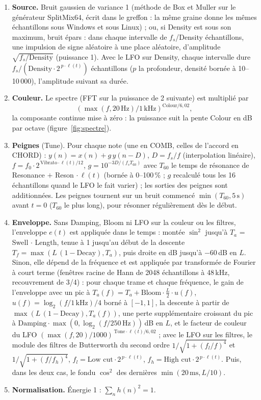 \documentclass[a4paper,11pt]{article}
\newcommand{\dB}{\,dB}
\begin{document}
\begin{enumerate}
\item \textbf{Source.} Bruit gaussien de variance 1 (méthode de Box et Muller sur le générateur
  SplitMix64, écrit dans le greffon : la même graine donne les mêmes échantillons sous Windows et
  sous Linux) ; ou, si Density est sous son maximum, bruit épars : dans chaque intervalle de
  $f_s$/Density échantillons, une impulsion de signe aléatoire à une place aléatoire, d'amplitude
  $\sqrt{f_s/\text{Density}}$ (puissance 1). Avec le LFO sur Density, chaque intervalle dure
  $f_s / (\text{Density} \cdot 2^{\,p \cdot \ell(t)})$ échantillons ($p$ la profondeur, densité bornée
  à 10--10\,000), l'amplitude suivant sa durée.
\item \textbf{Couleur.} Le spectre (FFT sur la puissance de 2 suivante) est multiplié par
  \[ \left(\max(f, 20\,\text{Hz}) / 1\,\text{kHz}\right)^{\text{Colour}/6{,}02}, \]
  la composante continue mise à zéro : la puissance suit la pente Colour en dB par octave
  (figure~\ref{fig:spectre}).
\item \textbf{Peignes} (Tune). Pour chaque note (une en COMB, celles de l'accord en CHORD) :
  $y(n) = x(n) + g\, y(n - D)$, $D = f_s / f$ (interpolation linéaire), $f = f_0 \cdot 2^{\,\text{Vibrato}
  \cdot \ell(t)/12}$, $g = 10^{-3 D / (f_s T_{60})}$ avec $T_{60}$ le temps de
  résonance de Resonance $+$ Reson $\cdot\, \ell(t)$ (bornée à 0--100\,\% ; $g$ recalculé tous les
  16 échantillons quand le LFO le fait varier) ; les sorties des peignes sont additionnées. Les
  peignes tournent sur un bruit commencé $\min(T_{60}, 5\,\text{s})$ avant $t = 0$ ($T_{60}$ le plus
  long), pour résonner régulièrement dès le début.
\item \textbf{Enveloppe.} Sans Damping, Bloom ni LFO sur la couleur ou les filtres, l'enveloppe $e(t)$ est appliquée dans le
  temps : montée $\sin^2$ jusqu'à $T_a$ = Swell $\cdot$ Length, tenue à 1 jusqu'au début de la
  descente $T_f = \max(L\,(1 - \text{Decay}), T_a)$, puis droite en dB jusqu'à $-60$\dB{} en $L$.
  Sinon, elle dépend de la fréquence et est appliquée par transformée de Fourier à court terme
  (fenêtres racine de Hann de 2048 échantillons à 48\,kHz, recouvrement de 3/4) : pour chaque trame
  et chaque fréquence, le gain de l'enveloppe avec un pic à $T_a(f) = T_a + \text{Bloom} \cdot
  \frac{L}{2} \cdot u(f)$, $u(f) = \log_2(f / 1\,\text{kHz})/4$ borné à $[-1, 1]$, la descente à
  partir de $\max(L\,(1 - \text{Decay}), T_a(f))$, une perte supplémentaire croissant du pic à
  $\text{Damping} \cdot \max(0, \log_2(f / 250\,\text{Hz}))$\dB{} en $L$, et le facteur de
  couleur du LFO $(\max(f, 20) / 1000)^{\,\text{Tone} \cdot \ell(t)/6{,}02}$ ; avec le LFO sur les
  filtres, le module des filtres de Butterworth du second ordre $1/\sqrt{1 + (f_l/f)^4}$ et
  $1/\sqrt{1 + (f/f_h)^4}$, $f_l = \text{Low cut} \cdot 2^{\,p \cdot \ell(t)}$,
  $f_h = \text{High cut} \cdot 2^{\,p \cdot \ell(t)}$.
  Puis, dans les deux cas, le fondu $\cos^2$ des dernières $\min(20\,\text{ms}, L/10)$.
\item \textbf{Normalisation.} Énergie 1 : $\sum_n h(n)^2 = 1$.
\end{enumerate}
\end{document}
